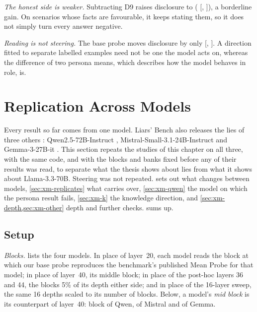 \emph{The honest side is weaker.} Subtracting D9 raises disclosure to 
( [, ]), a borderline
gain. On scenarios whose facts are favourable, it keeps stating them, so it does not simply turn every
answer negative.

\emph{Reading is not steering.} The base probe moves disclosure by only
 [, ]. A direction
fitted to separate labelled examples need not be one the model acts on, whereas the difference of two
persona means, which describes how the model behaves in role, is.

\FloatBarrier
\section{Replication Across Models}
\label{sec:xmodel}

Every result so far comes from one model. Liars' Bench also releases the lies of three others
\cite{kretschmar2025liars}: Qwen2.5-72B-Instruct \cite{qwen2024qwen25}, Mistral-Small-3.1-24B-Instruct
\cite{mistral2025small31} and Gemma-3-27B-it \cite{gemma2025gemma3}. This section repeats the studies of
this chapter on all three, with the same code, and with the blocks and banks fixed before any of their
results was read, to separate what the thesis shows about lies from what it shows about Llama-3.3-70B. Steering was not repeated.  sets out what changes between models,
\cref{sec:xm-replicates} what carries over, \cref{sec:xm-qwen} the model on which the persona result
fails, \cref{sec:xm-k} the knowledge direction, and \cref{sec:xm-depth,sec:xm-other} depth and further
checks.  sums up.

\subsection{Setup}
\label{sec:xm-setup}

\emph{Blocks.}  lists the four models. In place of layer~20, each model reads the
block at which our base probe reproduces the benchmark's published Mean Probe for that model; in place of
layer~40, its middle block; in place of the post-hoc layers 36 and 44, the blocks 5\% of its depth either
side; and in place of the 16-layer sweep, the same 16 depths scaled to its number of blocks. Below, a
model's \emph{mid block} is its counterpart of layer~40: block  of Qwen, 
of Mistral and  of Gemma.

